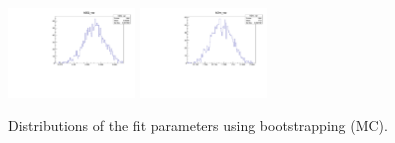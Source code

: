\begin{figure}[tb]
\begin{center}
	\includegraphics[width=0.3\textwidth]{figs/MCVars/DG_var.pdf}
	\includegraphics[width=0.3\textwidth]{figs/MCVars/Dm_var.pdf}
   \end{center}
   \caption{
	Distributions of the fit parameters using bootstrapping (MC).
   }
   \label{fig:Vars_MC}
\end{figure}

